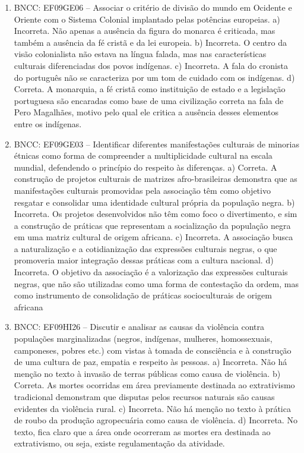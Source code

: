 \begin{enumerate}
\item
BNCC: EF09GE06 -- Associar o critério de divisão do mundo em Ocidente e
Oriente com o Sistema Colonial implantado pelas potências europeias.
a) Incorreta. Não apenas a ausência da figura do monarca é criticada, mas
também a ausência da fé cristã e da lei europeia.
b) Incorreta. O centro da visão colonialista não estava na língua falada,
mas nas características culturais diferenciadas dos povos indígenas.
c) Incorreta. A fala do cronista do português não se caracteriza por um tom de cuidado com os indígenas.
d) Correta. A monarquia, a fé cristã como instituição de estado e
a legislação portuguesa são encaradas como base de uma civilização
correta na fala de Pero Magalhães, motivo pelo qual ele critica a ausência
desses elementos entre os indígenas.

\item
BNCC: EF09GE03 -- Identificar diferentes manifestações
culturais de minorias étnicas como forma de compreender a multiplicidade
cultural na escala mundial, defendendo o princípio do respeito às
diferenças. a)  Correta. A construção de projetos culturais de matrizes afro-brasileiras demonstra que as manifestações culturais promovidas pela associação têm como objetivo resgatar e consolidar uma identidade cultural própria da população negra. b)  Incorreta. Os projetos desenvolvidos não têm como foco o divertimento, e sim a construção de práticas que representam a socialização da população negra em uma matriz cultural de origem africana. c)  Incorreta. A associação busca a naturalização e a cotidianização das expressões culturais negras, o que promoveria maior integração dessas práticas com a cultura nacional. d)  Incorreta. O objetivo da associação é a valorização das expressões culturais negras, que não são utilizadas como uma forma de contestação da ordem, mas como instrumento de consolidação de práticas socioculturais de origem africana

\item
BNCC: EF09HI26 -- Discutir e analisar as causas da violência
contra populações marginalizadas (negros, indígenas, mulheres,
homossexuais, camponeses, pobres etc.) com vistas à tomada de
consciência e à construção de uma cultura de paz, empatia e respeito às
pessoas. a)  Incorreta. Não há menção no texto à invasão de terras públicas como causa de violência. b)  Correta. As mortes ocorridas em área previamente destinada ao extrativismo tradicional demonstram que disputas pelos recursos naturais são causas evidentes da violência rural. c)  Incorreta. Não há menção no texto à prática de roubo da produção agropecuária como causa de violência. d)  Incorreta. No texto, fica claro que a área onde ocorreram as mortes era destinada ao extrativismo, ou seja, existe regulamentação da atividade.
\end{enumerate}

